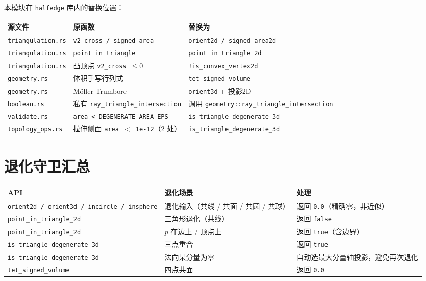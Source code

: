\documentclass[11pt,a4paper]{article}
\begin{document}
本模块在 \texttt{halfedge} 库内的替换位置：

\begin{center}
\renewcommand{\arraystretch}{1.18}
\begin{tabular}{@{}lll@{}}
  \toprule
  \textbf{源文件} & \textbf{原函数} & \textbf{替换为} \\
  \midrule
  \texttt{triangulation.rs} & \texttt{v2\_cross / signed\_area}        & \texttt{orient2d / signed\_area2d} \\
  \texttt{triangulation.rs} & \texttt{point\_in\_triangle}             & \texttt{point\_in\_triangle\_2d} \\
  \texttt{triangulation.rs} & 凸顶点 \texttt{v2\_cross $\le 0$}        & \texttt{!is\_convex\_vertex2d} \\
  \texttt{geometry.rs}      & 体积手写行列式                            & \texttt{tet\_signed\_volume} \\
  \texttt{geometry.rs}      & Möller-Trumbore                          & \texttt{orient3d} + 投影2D \\
  \texttt{boolean.rs}       & 私有 \texttt{ray\_triangle\_intersection} & 调用 \texttt{geometry::ray\_triangle\_intersection} \\
  \texttt{validate.rs}      & \texttt{area < DEGENERATE\_AREA\_EPS}    & \texttt{is\_triangle\_degenerate\_3d} \\
  \texttt{topology\_ops.rs} & 拉伸侧面 \texttt{area $<$ 1e-12}（2 处） & \texttt{is\_triangle\_degenerate\_3d} \\
  \bottomrule
\end{tabular}
\end{center}

\section{退化守卫汇总}

\begin{center}
\renewcommand{\arraystretch}{1.18}
\begin{tabular}{@{}lll@{}}
  \toprule
  \textbf{API} & \textbf{退化场景} & \textbf{处理} \\
  \midrule
  \texttt{orient2d / orient3d / incircle / insphere}
    & 退化输入（共线 / 共面 / 共圆 / 共球）
    & 返回 \texttt{0.0}（精确零，非近似） \\
  \texttt{point\_in\_triangle\_2d}
    & 三角形退化（共线）       & 返回 \texttt{false} \\
  \texttt{point\_in\_triangle\_2d}
    & $p$ 在边上 / 顶点上       & 返回 \texttt{true}（含边界） \\
  \texttt{is\_triangle\_degenerate\_3d}
    & 三点重合                  & 返回 \texttt{true} \\
  \texttt{is\_triangle\_degenerate\_3d}
    & 法向某分量为零            & 自动选最大分量轴投影，避免再次退化 \\
  \texttt{tet\_signed\_volume}
    & 四点共面                  & 返回 \texttt{0.0} \\
  \bottomrule
\end{tabular}
\end{center}
\end{document}
